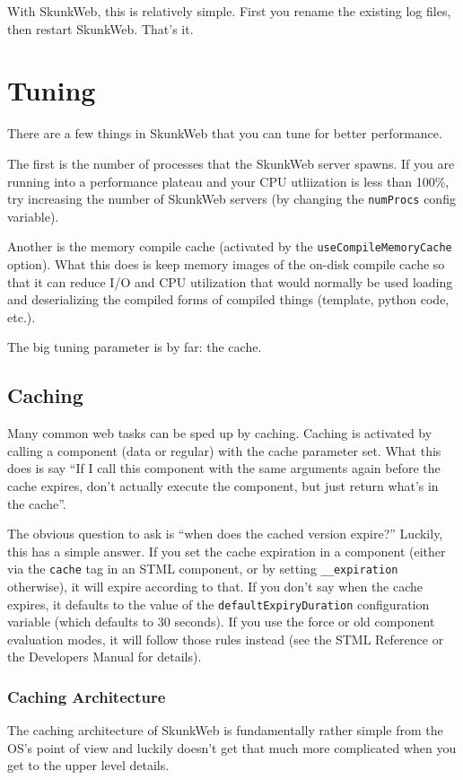 \documentclass[titlepage]{manual}
\begin{document}
With SkunkWeb, this is relatively simple.  First you rename the existing
log files, then restart SkunkWeb.  That's it.

\chapter{Tuning}
There are a few things in SkunkWeb that you can tune for better
performance.  

The first is the number of processes that the SkunkWeb
server spawns.  If you are running into a performance plateau and your
CPU utliization is less than 100\%, try increasing the number of SkunkWeb
servers (by changing the \texttt{numProcs} config variable).

Another is the memory compile cache (activated by the
\texttt{useCompileMemoryCache} option).  What this does is keep memory
images of the on-disk compile cache so that it can reduce I/O and CPU
utilization that would normally be used loading and deserializing the
compiled forms of compiled things (template, python code, etc.).

The big tuning parameter is by far:  the cache.

\section{Caching}
Many common web tasks can be sped up by caching.  Caching is activated
by calling a component (data or regular) with the cache parameter set.
What this does is say ``If I call this component with the same arguments
again before the cache expires, don't actually execute the component, but
just return what's in the cache''.  

The obvious question to ask is ``when does the cached version
expire?''  Luckily, this has a simple answer.  If you set the cache
expiration in a component (either via the \texttt{cache} tag in an
STML component, or by setting \texttt{__expiration} otherwise), it
will expire according to that.  If you don't say when the cache
expires, it defaults to the value of the
\texttt{defaultExpiryDuration} configuration variable (which defaults
to 30 seconds).  If you use the force or old component evaluation
modes, it will follow those rules instead (see the STML Reference or
the Developers Manual for details).

\subsection{Caching Architecture}
The caching architecture of SkunkWeb is fundamentally rather simple
from the OS's point of view and luckily doesn't get that much more
complicated when you get to the upper level details.
\end{document}
